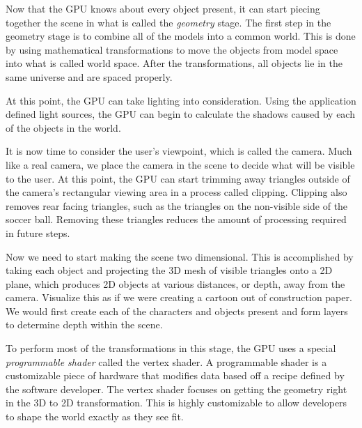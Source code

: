 \documentclass[12pt] {article}
\begin{document}
Now that the GPU knows about every object present, it can start piecing together the scene in what is called the \emph{geometry} stage. The first step in the geometry stage is to combine all of the models into a common world. This is done by using mathematical transformations to move the objects from model space into what is called world space. After the transformations, all objects lie in the same universe and are spaced properly. 

At this point, the GPU can take lighting into consideration. Using the application defined light sources, the GPU can begin to calculate the shadows caused by each of the objects in the world.

It is now time to consider the user's viewpoint, which is called the camera. Much like a real camera, we place the camera in the scene to decide what will be visible to the user. At this point, the GPU can start trimming away triangles outside of the camera's rectangular viewing area in a process called clipping. Clipping also removes rear facing triangles, such as the triangles on the non-visible side of the soccer ball. Removing these triangles reduces the amount of processing required in future steps.

Now we need to start making the scene two dimensional. This is accomplished by taking each object and projecting the 3D mesh of visible triangles onto a 2D plane, which produces 2D objects at various distances, or depth, away from the camera. Visualize this as if we were creating a cartoon out of construction paper. We would first create each of the characters and objects present and form layers to determine depth within the scene. 

To perform most of the transformations in this stage, the GPU uses a special \emph{programmable shader} called the vertex shader. A programmable shader is a customizable piece of hardware that modifies data based off a recipe defined by the software developer. The vertex shader focuses on getting the geometry right in the 3D to 2D transformation. This is highly customizable to allow developers to shape the world exactly as they see fit.
\end{document}

